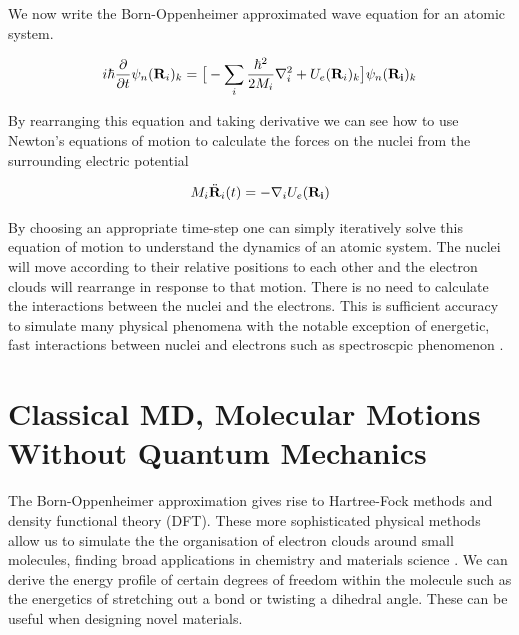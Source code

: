 We now write the Born-Oppenheimer approximated wave equation for an atomic system.  


\begin{equation}
	i\hbar \frac{\partial}{\partial t} \psi_n(\bold{R}_i)_k = \big[ -\sum_i \frac{\hbar^2}{2M_i} \nabla^2_i + U_e(\bold{R}_i)_k\big] \psi_n(\bold{R_i})_k 
\end{equation}

By rearranging this equation and taking derivative we can see how to use Newton's equations of motion to calculate the forces on the nuclei from the surrounding electric potential 

\begin{equation}
	M_i \ddot{\bold{R}}_i (t) = -\nabla_i U_e (\bold{R_i})
	\label{Newtons_equations}
\end{equation}

By choosing an appropriate time-step one can simply iteratively solve this equation of motion to understand the dynamics of an atomic system. The nuclei will move according to their relative positions to each other and the electron clouds will rearrange in response to that motion. There is no need to calculate the interactions between the nuclei and the electrons. This is sufficient accuracy to simulate many physical phenomena with the notable exception of energetic, fast interactions between nuclei and electrons such as spectroscpic phenomenon \cite{sherrill}. 
%




%
%
%


\section{Classical MD, Molecular Motions Without Quantum Mechanics}
The Born-Oppenheimer approximation gives rise to Hartree-Fock methods and density functional theory (DFT). These more sophisticated physical methods allow us to simulate the the organisation of electron clouds around small molecules, finding broad applications in chemistry and materials science \cite{vanmourik2014}. We can derive the energy profile of certain degrees of freedom within the molecule such as the energetics of stretching out a bond or twisting a dihedral angle. These can be useful when designing novel materials. 

